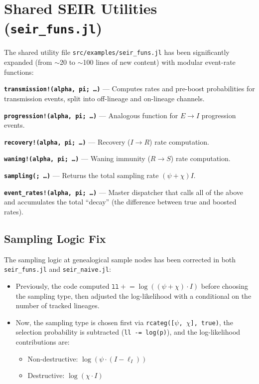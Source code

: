 \documentclass[11pt,letterpaper]{article}
\begin{document}
\section{Shared SEIR Utilities (\texttt{seir\_funs.jl})}

The shared utility file \texttt{src/examples/seir\_funs.jl} has been
significantly expanded (from $\sim$20 to $\sim$100 lines of new
content) with modular event-rate functions:

\textbf{\texttt{transmission!(alpha, pi; \ldots)}} --- Computes rates
and pre-boost probabilities for transmission events, split into
off-lineage and on-lineage channels.

\textbf{\texttt{progression!(alpha, pi; \ldots)}} --- Analogous
function for $E \to I$ progression events.

\textbf{\texttt{recovery!(alpha, pi; \ldots)}} --- Recovery
($I \to R$) rate computation.

\textbf{\texttt{waning!(alpha, pi; \ldots)}} --- Waning immunity
($R \to S$) rate computation.

\textbf{\texttt{sampling(; \ldots)}} --- Returns the total sampling
rate $(\psi + \chi) I$.

\textbf{\texttt{event\_rates!(alpha, pi; \ldots)}} --- Master
dispatcher that calls all of the above and accumulates the total
``decay'' (the difference between true and boosted rates).

\subsection{Sampling Logic Fix}

The sampling logic at genealogical sample nodes has been corrected in
both \texttt{seir\_funs.jl} and \texttt{seir\_naive.jl}:

\begin{itemize}
  \item Previously, the code computed
        $\texttt{ll} \mathrel{+}= \log((\psi+\chi) \cdot I)$ before
        choosing the sampling type, then adjusted the log-likelihood
        with a conditional on the number of tracked lineages.
  \item Now, the sampling type is chosen first via
        \texttt{rcateg([$\psi$, $\chi$], true)}, the selection
        probability is subtracted (\texttt{ll -= log(p)}), and the
        log-likelihood contributions are:
        \begin{itemize}
          \item Non-destructive: $\log(\psi \cdot (I - \ell_I))$
          \item Destructive: $\log(\chi \cdot I)$
        \end{itemize}
\end{itemize}
\end{document}
